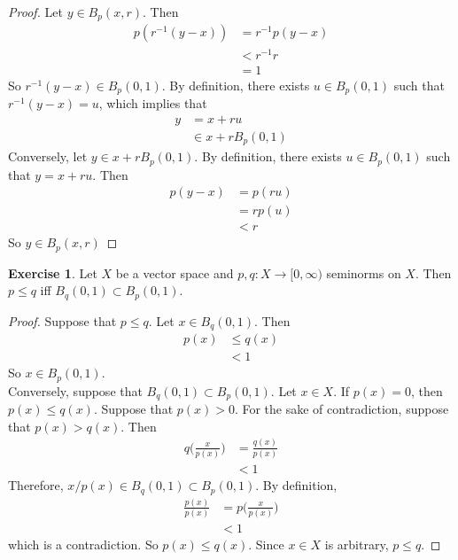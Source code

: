 \documentclass[12pt]{amsart}
\theoremstyle{definition}
\newtheorem{ex}[definition]{Exercise}
\begin{document}
	\begin{proof}
		Let $y \in B_p(x, r)$. Then  
		\begin{align*}
			p(r^{-1}(y - x)) 
			&= r^{-1}p(y - x) \\
			&< r^{-1} r \\
			&= 1
		\end{align*}
		So $r^{-1}(y - x) \in B_p(0, 1)$. By definition, there exists $u \in B_p(0,1)$ such that $r^{-1}(y - x) = u$, which implies that 
		\begin{align*}
			y 
			&=  x + ru \\
			&\in x + rB_p(0, 1)
		\end{align*} 
		Conversely, let $y \in x + rB_p(0, 1)$. By definition, there exists $u \in B_p(0,1)$ such that $y = x + ru$. Then 
		\begin{align*}
			p(y - x) 
			&= p(ru) \\
			&= rp(u) \\
			&< r
		\end{align*}
	So $y \in B_p(x, r)$ 
	\end{proof}

	\begin{ex}
		Let $X$ be a vector space and $p,q:X \rightarrow [0, \infty)$ seminorms on $X$. Then $p \leq q$ iff $B_q(0,1) \subset B_p(0,1)$.  
	\end{ex}

	\begin{proof}
		Suppose that $p \leq q$. Let $x \in B_q(0,1)$. Then 
		\begin{align*}
			p(x) 
			& \leq q(x) \\
			& < 1
		\end{align*}
		So $x \in B_p(0,1)$. \\
		Conversely, suppose that $B_q(0,1) \subset B_p(0,1)$. Let $x \in X$. If $p(x) = 0$, then $p(x) \leq q(x)$. Suppose that $p(x) > 0$. For the sake of contradiction, suppose that $p(x) > q(x)$. Then 
		\begin{align*}
			q \bigg( \frac{x}{p(x)}\bigg) 
			&= \frac{q(x)}{p(x)} \\
			& < 1
		\end{align*}
		Therefore, $x/p(x) \in B_q(0,1) \subset B_p(0,1)$. By definition,
		\begin{align*}
			\frac{p(x)}{p(x)}
			& =  p\bigg( \frac{x}{p(x)}\bigg)\\
			&< 1
		\end{align*} 
		which is a contradiction. So $p(x) \leq q(x)$. Since $x \in X$ is arbitrary, $p \leq q$.
	\end{proof}
\end{document}
